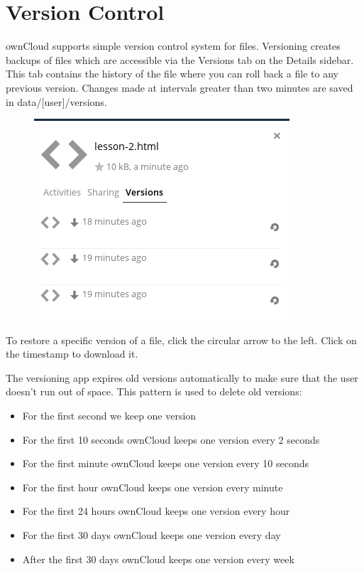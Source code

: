\documentclass[letterpaper,10pt,english]{sphinxmanual}
\begin{document}
\section{Version Control}
\label{files/version_control:version-control}\label{files/version_control::doc}
ownCloud supports simple version control system for files. Versioning creates
backups of files which are accessible via the Versions tab on the Details
sidebar. This tab contains the history of the file where you can roll back a
file to any previous version. Changes made at intervals greater than two minutes
are saved in data/{[}user{]}/versions.
\begin{figure}[htbp]
\centering

\includegraphics{files_versioning.png}
\end{figure}

To restore a specific version of a file, click the circular arrow to the left.
Click on the timestamp to download it.

The versioning app expires old versions automatically to make sure that
the user doesn't run out of space. This pattern is used to delete
old versions:
\begin{itemize}
\item {} 
For the first second we keep one version

\item {} 
For the first 10 seconds ownCloud keeps one version every 2 seconds

\item {} 
For the first minute ownCloud keeps one version every 10 seconds

\item {} 
For the first hour ownCloud keeps one version every minute

\item {} 
For the first 24 hours ownCloud keeps one version every hour

\item {} 
For the first 30 days ownCloud keeps one version every day

\item {} 
After the first 30 days ownCloud keeps one version every week

\end{itemize}
\end{document}
